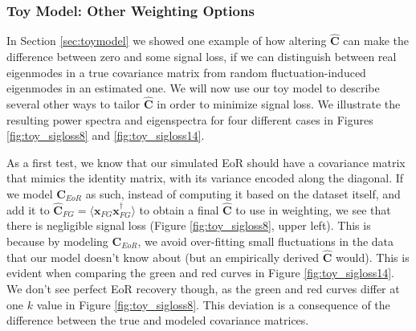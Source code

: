 \documentclass[preprint2,numberedappendix,tighten]{aastex6}  %
\begin{document}
\subsubsection{Toy Model: Other Weighting Options}
\label{sec:otherweight}

In Section \ref{sec:toymodel} we showed one example of how altering $\hat{\textbf{C}}$ can make the difference between zero and some signal loss, if we can distinguish between real eigenmodes in a true covariance matrix from random fluctuation-induced eigenmodes in an estimated one. We will now use our toy model to describe several other ways to tailor $\hat{\textbf{C}}$ in order to minimize signal loss. We illustrate the resulting power spectra and eigenspectra for four different cases in Figures \ref{fig:toy_sigloss8} and \ref{fig:toy_sigloss14}.

As a first test, we know that our simulated EoR should have a covariance matrix that mimics the identity matrix, with its variance encoded along the diagonal. If we model $\textbf{C}_{EoR}$ as such, instead of computing it based on the dataset itself, and add it to $\hat{\textbf{C}}_{FG} = \langle\textbf{x}_{FG}\textbf{x}_{FG}^{\dagger}\rangle$ to obtain a final $\hat{\textbf{C}}$ to use in weighting, we see that there is negligible signal loss (Figure \ref{fig:toy_sigloss8}, upper left). This is because by modeling $\textbf{C}_{EoR}$, we avoid over-fitting small fluctuations in the data that our model doesn't know about (but an empirically derived $\hat{\textbf{C}}$ would). This is evident when comparing the green and red curves in Figure \ref{fig:toy_sigloss14}. We don't see perfect EoR recovery though, as the green and red curves differ at one $k$ value in Figure \ref{fig:toy_sigloss8}. This deviation is a consequence of the difference between the true and modeled covariance matrices.
\end{document}
